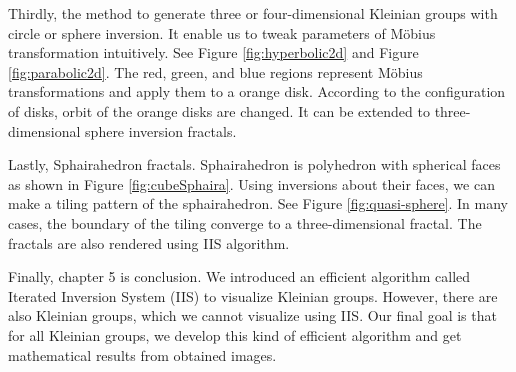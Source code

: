 \documentclass[uplatex, dvipdfmx]{article}
\begin{document}
Thirdly, the method to generate three or four-dimensional Kleinian groups with
circle or sphere inversion. It enable us to tweak parameters of M\"obius
transformation intuitively.
See Figure \ref{fig:hyperbolic2d} and Figure \ref{fig:parabolic2d}.
The red, green, and blue regions represent M\"obius transformations and
apply them to a orange disk.
According to the configuration of disks, orbit of the orange disks are
changed.
It can be extended to three-dimensional sphere inversion fractals.

Lastly, Sphairahedron fractals. Sphairahedron is polyhedron with spherical
faces as shown in Figure \ref{fig:cubeSphaira}.
Using inversions about their faces, we can make a tiling pattern
of the sphairahedron. See Figure \ref{fig:quasi-sphere}.
In many cases, the boundary of the tiling converge to a
three-dimensional fractal. 
The fractals are also rendered using IIS algorithm.

Finally, chapter 5 is conclusion. We introduced an efficient algorithm
called Iterated Inversion System (IIS) to visualize Kleinian groups.
However, there are also Kleinian groups, which we cannot
visualize using IIS.
Our final goal is that for all Kleinian groups, we develop this kind of
efficient algorithm and get mathematical results from obtained images.
\end{document}
